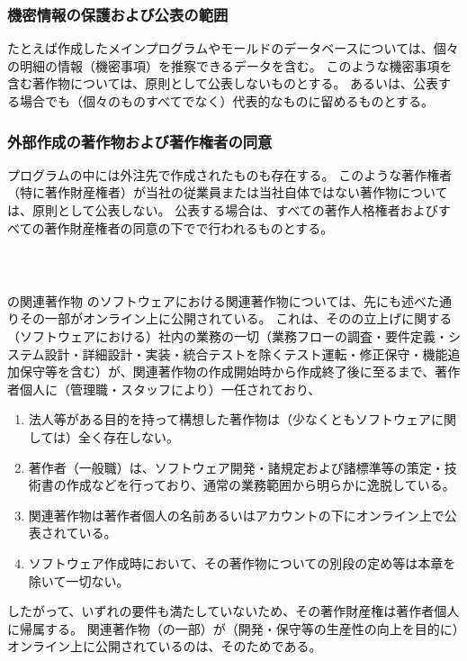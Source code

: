 \subsubsection{機密情報の保護および公表の範囲}
たとえば作成したメインプログラムやモールドのデータベースについては、個々の明細の情報（機密事項）を推察できるデータを含む。
このような機密事項を含む著作物については、原則として公表しないものとする。
あるいは、公表する場合でも（個々のものすべてでなく）代表的なものに留めるものとする。

\subsubsection{外部作成の著作物および著作権者の同意}
プログラムの中には外注先で作成されたものも存在する。
このような著作権者（特に著作財産権者）が当社の従業員または当社自体ではない著作物については、原則として公表しない。
公表する場合は、すべての著作人格権者およびすべての著作財産権者の同意の下でで行われるものとする。



\clearpage
~\vfill
\begin{Column}{\DMname の関連著作物}
\DMname のソフトウェアにおける関連著作物については、先にも述べた通りその一部がオンライン上に公開されている。
これは、その\DMname の立上げに関する（ソフトウェアにおける）社内の業務の一切（業務フローの調査・要件定義・システム設計・詳細設計・実装・統合テストを除くテスト運転・修正保守・機能追加保守等を含む）が、関連著作物の作成開始時から作成終了後に至るまで、著作者個人に（管理職・スタッフにより）一任されており、
\begin{enumerate}[label=\Roman*]
\item 法人等がある目的を持って構想した著作物は（少なくともソフトウェアに関しては）全く存在しない。
\item 著作者（一般職）は、ソフトウェア開発・諸規定および諸標準等の策定・技術書の作成などを行っており、通常の業務範囲から明らかに逸脱している。
\item 関連著作物は著作者個人の名前あるいはアカウントの下にオンライン上で公表されている。
\item ソフトウェア作成時において、その著作物についての別段の定め等は本章を除いて一切ない。
\end{enumerate}
したがって、いずれの要件も満たしていないため、その著作財産権は著作者個人に帰属する。
関連著作物（の一部）が（開発・保守等の生産性の向上を目的に）オンライン上に公開されているのは、そのためである。
\end{Column}




